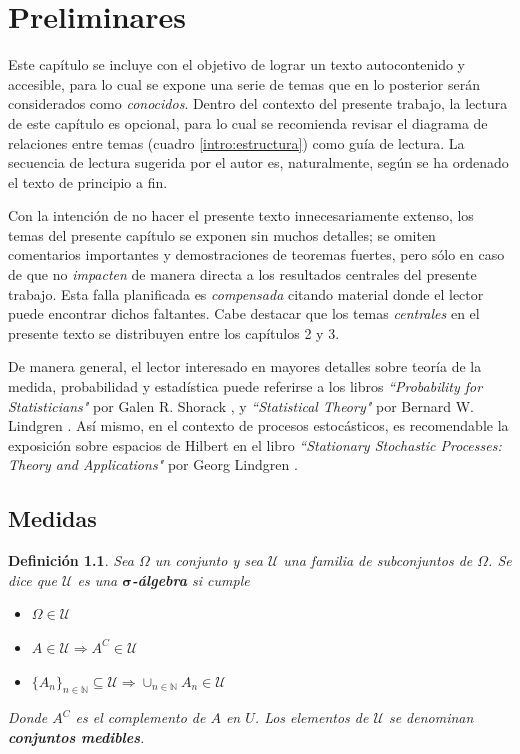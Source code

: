 \documentclass[12pt,letterpaper,draft]{book}
\newtheorem{definicion}{Definición}[chapter]
\begin{document}
\chapter{Preliminares}

Este capítulo se incluye con el objetivo de lograr un texto autocontenido y accesible, para lo cual se expone una serie de temas que en lo posterior serán considerados como \textit{conocidos}.
%
Dentro del contexto del presente trabajo, la lectura de este capítulo es opcional, para lo cual se recomienda revisar el diagrama de relaciones entre temas (cuadro \ref{intro:estructura}) como guía de lectura.
%
La secuencia de lectura sugerida por el autor es, naturalmente, según se ha ordenado el texto de principio a fin.

Con la intención de no hacer el presente texto innecesariamente extenso, los temas del presente capítulo se exponen sin muchos detalles; se omiten comentarios importantes y demostraciones de teoremas fuertes, pero sólo en caso de que no \textit{impacten} de manera directa a los resultados centrales del presente trabajo.
%
Esta falla planificada es \textit{compensada} citando material donde el lector puede encontrar dichos faltantes.
%
Cabe destacar que los temas \textit{centrales} en el presente texto se distribuyen entre los capítulos 2 y 3.

De manera general, el lector interesado en mayores detalles sobre teoría de la medida, probabilidad y estadística puede referirse a los libros \textit{``Probability for Statisticians"} por Galen R. Shorack \cite{probabilidad_shorack}, y \textit{``Statistical Theory"} por Bernard W. Lindgren \cite{estadistica_lindgren}.
%
Así mismo, en el contexto de procesos estocásticos, es recomendable la exposición sobre espacios de Hilbert en el libro \textit{``Stationary Stochastic Processes: Theory and Applications"} por Georg Lindgren \cite{estacionariedad_lindgren}.


\section{Medidas}

\begin{definicion}%
Sea $\Omega$ un conjunto y sea $\mathcal{U}$ una familia de subconjuntos de $\Omega$. Se dice que $\mathcal{U}$ es una \textbf{$\boldsymbol{\sigma}$-álgebra} si cumple
\begin{itemize}
\item $\Omega \in \mathcal{U}$
\item $A \in \mathcal{U} \Rightarrow A^{C} \in \mathcal{U}$
\item 
$ \displaystyle \{ A_n \}_{n\in \mathbb{N}} \subseteq \mathcal{U} 
\Rightarrow \cup_{n\in \mathbb{N}} A_n \in \mathcal{U}$
\end{itemize}
Donde $A^{C}$ es el complemento de $A$ en $U$. Los elementos de $\mathcal{U}$ se denominan \textbf{conjuntos medibles}. 
\end{definicion}
\end{document}
